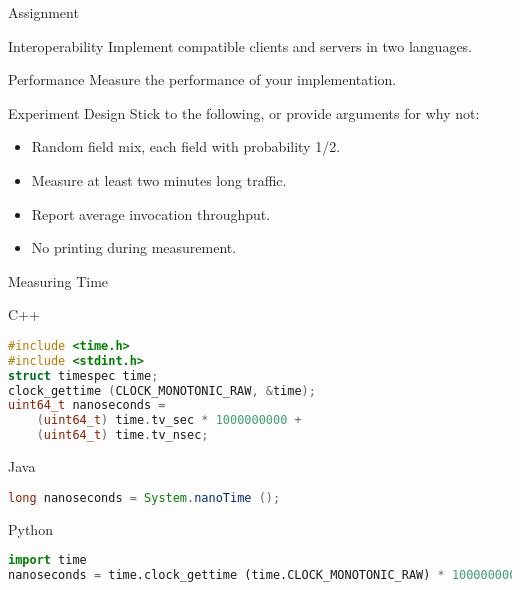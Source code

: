 \begin{frame}{Assignment}
    \begin{block}{Interoperability}
        Implement compatible clients and servers in two languages.
    \end{block}

    \begin{block}{Performance}
        Measure the performance of your implementation.
    \end{block}

    \begin{block}{Experiment Design}
        Stick to the following, or provide arguments for why not:
        \begin{itemize}
            \item Random field mix, each field with probability 1/2.
            \item Measure at least two minutes long traffic.
            \item Report average invocation throughput.
            \item No printing during measurement.
        \end{itemize}
    \end{block}
\end{frame}


\begin{frame}[fragile]{Measuring Time}
    \begin{block}{C++}
\begin{lstlisting}[language=c,style=mini]
#include <time.h>
#include <stdint.h>
struct timespec time;
clock_gettime (CLOCK_MONOTONIC_RAW, &time);
uint64_t nanoseconds =
    (uint64_t) time.tv_sec * 1000000000 +
    (uint64_t) time.tv_nsec;
\end{lstlisting}
    \end{block}
    \begin{block}{Java}
\begin{lstlisting}[language=java,style=mini]
long nanoseconds = System.nanoTime ();
\end{lstlisting}
    \end{block}
    \begin{block}{Python}
\begin{lstlisting}[language=python,style=mini]
import time
nanoseconds = time.clock_gettime (time.CLOCK_MONOTONIC_RAW) * 1000000000
\end{lstlisting}
    \end{block}
\end{frame}


